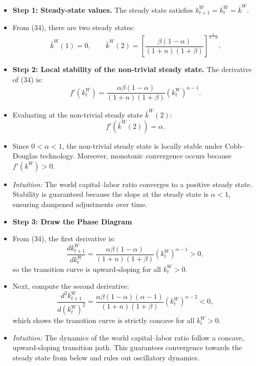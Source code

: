 \documentclass[12pt]{article}
\begin{document}
\begin{itemize}
  \item \textbf{Step 1: Steady-state values.}  
  The steady state satisfies $k_{t+1}^W = k_t^W = \bar{k}^W$.  

  \item From (34), there are two steady states:  
  \[
  \bar{k}^W(1) = 0, 
  \qquad 
  \bar{k}^W(2) = \left[\frac{\beta(1-\alpha)}{(1+n)(1+\beta)}\right]^{\tfrac{1}{1-\alpha}}.
  \]

  \item \textbf{Step 2: Local stability of the non-trivial steady state.}  
  The derivative of (34) is:
  \[
  f'(k_t^W) = \frac{\alpha \beta (1-\alpha)}{(1+n)(1+\beta)}(k_t^W)^{\alpha-1}. \tag{35}
  \]

  \item Evaluating at the non-trivial steady state $\bar{k}^W(2)$:
  \[
  f'(\bar{k}^W(2)) = \alpha. \tag{36}
  \]

  \item Since $0<\alpha<1$, the non-trivial steady state is locally stable under Cobb–Douglas technology. Moreover, monotonic convergence occurs because $f'(k^W)>0$.

  \item \textit{Intuition:} The world capital–labor ratio converges to a positive steady state. Stability is guaranteed because the slope at the steady state is $\alpha<1$, ensuring dampened adjustments over time.
\end{itemize}

\begin{itemize}
  \item \textbf{Step 3: Draw the Phase Diagram}  

  \item From (34), the first derivative is:
  \[
  \frac{dk_{t+1}^W}{dk_t^W} 
  = \frac{\alpha \beta (1-\alpha)}{(1+n)(1+\beta)} (k_t^W)^{\alpha-1} > 0,
  \]
  so the transition curve is upward-sloping for all $k_t^W > 0$.

  \item Next, compute the second derivative:
  \[
  \frac{d^2 k_{t+1}^W}{d(k_t^W)^2} 
  = \frac{\alpha \beta (1-\alpha)(\alpha-1)}{(1+n)(1+\beta)} (k_t^W)^{\alpha-2} < 0,
  \]
  which shows the transition curve is strictly concave for all $k_t^W > 0$.

  \item \textit{Intuition:} The dynamics of the world capital–labor ratio follow a concave, upward-sloping transition path. This guarantees convergence towards the steady state from below and rules out oscillatory dynamics.
\end{itemize}
\end{document}

